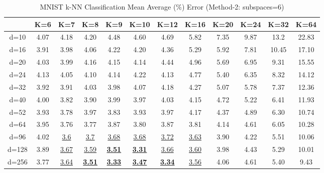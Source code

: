 \newpage{}
\begin{table}[H]
\centering
\label{tab:table1}
\begin{tabular}{|c|c|c|c|c|c|c|c|c|c|c|c|}
\hline
& K=6 & K=7 & K=8 & K=9 & K=10 & K=12 & K=16 & K=20 & K=24 & K=32 & K=64 \\
\hline
d=10 & 4.07 & 4.18 & 4.20 & 4.48 & 4.60 & 4.69 & 5.82 & 7.35 & 9.87 & 13.2 & 22.83 \\
d=16 & 3.91 & 3.98 & 4.06 & 4.22 & 4.20 & 4.36 & 5.29 & 5.92 & 7.81 & 10.45 & 17.10 \\
d=20 & 4.03 & 3.99 & 4.16 & 4.15 & 4.14 & 4.44 & 4.96 & 5.69 & 6.95 & 9.31 & 15.55 \\
d=24 & 4.13 & 4.05 & 4.10 & 4.14 & 4.22 & 4.13 & 4.77 & 5.40 & 6.35 & 8.32 & 14.12 \\
d=32 & 3.92 & 3.91 & 4.03 & 3.98 & 4.07 & 4.18 & 4.27 & 5.07 & 5.78 & 7.37 & 12.36 \\
d=40 & 4.00 & 3.82 & 3.90 & 3.99 & 3.97 & 4.03 & 4.15 & 4.72 & 5.22 & 6.41 & 11.93 \\
d=52 & 3.93 & 3.78 & 3.97 & 3.83 & 3.93 & 3.97 & 4.17 & 4.37 & 4.89 & 6.30 & 10.74 \\
d=64 & 3.95 & 3.76 & 3.77 & 3.87 & 3.80 & 3.87 & 3.81 & 4.14 & 4.61 & 6.05 & 10.28 \\
d=96 & 4.02 & \underline{3.6} & \underline{3.7} & \underline{3.68} & \underline{3.68} & \underline{3.72} & \underline{3.63} & 3.90 & 4.22 & 5.51 & 10.06 \\
d=128 & 3.89 & \underline{3.67} & \underline{3.59} & \textbf{\underline{3.51}} & \textbf{\underline{3.31}} & \underline{3.66} & \underline{3.60} & 3.98 & 4.43 & 5.29 & 10.01 \\
d=256 & 3.77 & \underline{3.64} & \textbf{\underline{3.51}} & \textbf{\underline{3.33}} & \textbf{\underline{3.47}} & \textbf{\underline{3.34}} & \underline{3.56} & 4.06 & 4.61 & 5.40 & 9.43 \\
\hline
\end{tabular}
\caption{MNIST k-NN Classification Mean Average (\%) Error (Method-2: subspaces=6)}
\end{table}

